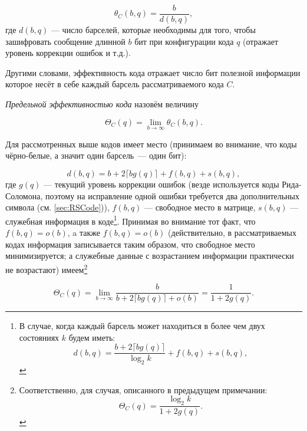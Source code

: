 \begin{equation}
	\label{eq:theta}
	\theta_C(b, q) = \frac{b}{d(b, q)},
\end{equation}
где $d(b, q)$ ---
число барселей, которые необходимы для того, чтобы зашифровать сообщение
длинной $b$ бит при конфигурации кода $q$ (отражает 
уровень коррекции ошибок и т.д.). 

Другими словами, эффективность кода отражает число бит полезной
информации которое несёт в себе каждый барсель рассматриваемого 
кода $C$.

\textit{Предельной эффективностью кода} назовём величину

\begin{equation}
	\label{eq:Theta}
	\Theta_C(q) = \lim_{b \to \infty }\theta_C(b, q).
\end{equation}

Для рассмотренных выше кодов имеет место (принимаем во внимание,
что коды чёрно-белые, а значит один барсель~--- один бит):

\begin{equation*}
    d(b, q) = b + 2 \lceil b g(q) \rceil + f(b, q) + s (b, q),
\end{equation*}
где $g(q)$ --- текущий уровень коррекции ошибок (везде используется 
коды Рида-Соломона, поэтому на исправление одной ошибки требуется два 
дополнительных символа (см. \ref{sec:RSCode})), $f(b, q)$ --- свободное
место в матрице,  $s (b, q)$ --- служебная информация в коде\footnote{
В случае, когда каждый барсель может находиться в более чем двух состояниях
$k$ будем иметь:
\begin{equation*}
    d(b, q) = \frac{b+ 2 \lceil b g(q) \rceil}{\log_2 k}  + f(b, q) + s (b, q),
\end{equation*}
}. 
Принимая
во внимание тот факт, что $f(b, q) = o(b)$, a также $f(b, q) = o(b)$
(действительно, в рассматриваемых кодах информация записывается таким 
образом, что свободное место минимизируется; а служебные данные с возрастанием 
информации практически не возрастают) имеем\footnote{
Соответственно, для случая, описанного в предыдущем примечании:
\begin{equation}
	\Theta_C(q) = 
	    \frac{\log_2 k}{1 + 2g(q)}.
\end{equation}
}

\begin{equation}
	\Theta_C(q) = \lim_{b \to \infty } \frac
	    {b}
	    {b +2 \lceil b g(q) \rceil + o(b)} = 
	    \frac{1}{1 + 2g(q)}.
\end{equation}